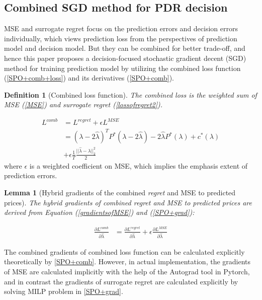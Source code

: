 \documentclass[journal]{IEEEtran}
\newtheorem{definition}{Definition}
\newtheorem{lemma}{Lemma}
\begin{document}
\subsection{Combined SGD method for PDR decision}
MSE and surrogate regret focus on the prediction errors and decision errors individually, which views prediction loss from the perspectives of prediction model and decision model. But they can be combined for better trade-off, and hence this paper proposes a decision-focused stochastic gradient decent (SGD) method for training prediction model by utilizing the combined loss function (\ref{SPO+comb+loss}) and its derivatives (\ref{SPO+comb}).

\begin{definition}[Combined loss function]
  The combined loss is the weighted sum of MSE (\ref{MSE}) and surrogate \textit{regret} (\ref{lossofregret2}).
\end{definition}

\begin{equation}
  \label{SPO+comb+loss}
  \begin{aligned}
    L^{comb} &= L^{regret} +\epsilon L^{MSE} \\
    &= (\lambda - 2 \hat{\lambda})^T P^*(\lambda - 2 \hat{\lambda}) - 2 \hat{\lambda} P^*(\lambda) + c^*(\lambda) \\
    &+ \epsilon \frac{1}{T} \frac{||\hat{\lambda} - \lambda ||^2_2}{2}
  \end{aligned}
\end{equation}
where $\epsilon$ is a weighted coefficient on MSE, which implies the emphasis extent of prediction errors.

\begin{lemma}[Hybrid gradients of the combined \textit{regret} and MSE to predicted prices]
  The hybrid gradients of combined \textit{regret} and MSE to predicted prices are derived from Equation (\ref{gradientsofMSE}) and (\ref{SPO+grad}):
\end{lemma}

\begin{equation}
  \label{SPO+comb}
  \begin{aligned}
    \frac{\partial L^{comb}}{\partial \hat{\lambda}} & = \frac{\partial L^{regret}}{\partial \hat{\lambda}}+\epsilon \frac{\partial L^{MSE}}{\partial \hat{\lambda}}
  \end{aligned}
\end{equation}

The combined gradients of combined loss function can be calculated explicitly theoretically by \ref{SPO+comb}. However, in actual implementation, the gradients of MSE are calculated implicitly with the help of the Autograd tool \cite{Paszke2019} in Pytorch, and in contrast the gradients of surrogate regret are calculated explicitly by solving MILP problem in \ref{SPO+grad}. 
\end{document}
